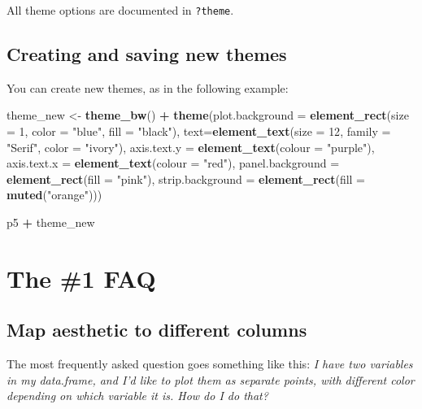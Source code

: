 \documentclass[]{book}
\newenvironment{Shaded}{\begin{snugshade}}{\end{snugshade}}
\newcommand{\KeywordTok}[1]{\textcolor[rgb]{0.13,0.29,0.53}{\textbf{#1}}}
\newcommand{\DataTypeTok}[1]{\textcolor[rgb]{0.13,0.29,0.53}{#1}}
\newcommand{\DecValTok}[1]{\textcolor[rgb]{0.00,0.00,0.81}{#1}}
\newcommand{\StringTok}[1]{\textcolor[rgb]{0.31,0.60,0.02}{#1}}
\newcommand{\OperatorTok}[1]{\textcolor[rgb]{0.81,0.36,0.00}{\textbf{#1}}}
\newcommand{\NormalTok}[1]{#1}
\begin{document}
All theme options are documented in \texttt{?theme}.

\subsection{Creating and saving new
themes}\label{creating-and-saving-new-themes}

You can create new themes, as in the following example:

\begin{Shaded}
\begin{Highlighting}[]
\NormalTok{theme_new <-}\StringTok{ }\KeywordTok{theme_bw}\NormalTok{() }\OperatorTok{+}
\StringTok{  }\KeywordTok{theme}\NormalTok{(}\DataTypeTok{plot.background =} \KeywordTok{element_rect}\NormalTok{(}\DataTypeTok{size =} \DecValTok{1}\NormalTok{, }\DataTypeTok{color =} \StringTok{"blue"}\NormalTok{, }\DataTypeTok{fill =} \StringTok{"black"}\NormalTok{),}
        \DataTypeTok{text=}\KeywordTok{element_text}\NormalTok{(}\DataTypeTok{size =} \DecValTok{12}\NormalTok{, }\DataTypeTok{family =} \StringTok{"Serif"}\NormalTok{, }\DataTypeTok{color =} \StringTok{"ivory"}\NormalTok{),}
        \DataTypeTok{axis.text.y =} \KeywordTok{element_text}\NormalTok{(}\DataTypeTok{colour =} \StringTok{"purple"}\NormalTok{),}
        \DataTypeTok{axis.text.x =} \KeywordTok{element_text}\NormalTok{(}\DataTypeTok{colour =} \StringTok{"red"}\NormalTok{),}
        \DataTypeTok{panel.background =} \KeywordTok{element_rect}\NormalTok{(}\DataTypeTok{fill =} \StringTok{"pink"}\NormalTok{),}
        \DataTypeTok{strip.background =} \KeywordTok{element_rect}\NormalTok{(}\DataTypeTok{fill =} \KeywordTok{muted}\NormalTok{(}\StringTok{"orange"}\NormalTok{)))}

\NormalTok{p5 }\OperatorTok{+}\StringTok{ }\NormalTok{theme_new}
\end{Highlighting}
\end{Shaded}

\section{The \#1 FAQ}\label{the-1-faq}

\subsection{Map aesthetic to different
columns}\label{map-aesthetic-to-different-columns}

The most frequently asked question goes something like this: \emph{I
have two variables in my data.frame, and I'd like to plot them as
separate points, with different color depending on which variable it is.
How do I do that?}
\end{document}
